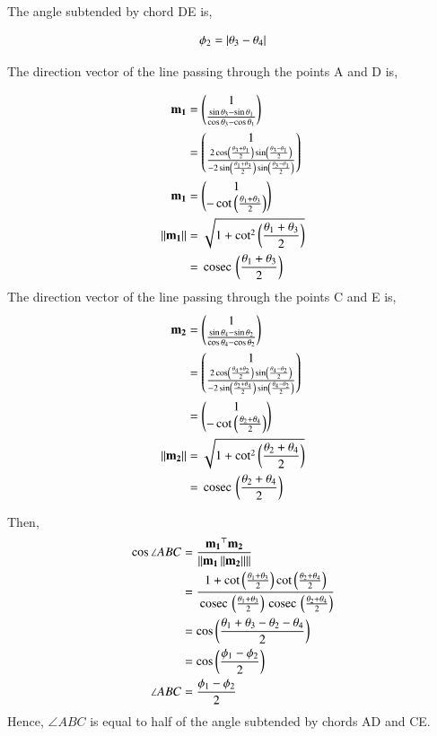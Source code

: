 \documentclass[journal,12pt,twocolumn]{IEEEtran}
\begin{document}
\begin{enumerate}
The angle subtended by chord DE is,

		\begin{align}
			\phi_2 = \left\vert\theta_3-\theta_4\right\vert
		\end{align}

The direction vector of the line passing through the points A and D is,

		\begin{align}
			\mathbf{m_1}&=\begin{pmatrix}1 \\ \frac{\sin \theta_3-\sin \theta_1}{\cos \theta_3-\cos \theta_1}\end{pmatrix}\\
			       &=\begin{pmatrix}1 \\ \frac{2\cos \left(\frac{\theta_3+\theta_1}{2}\right) \sin \left(\frac{\theta_3-\theta_1}{2}\right)}{-2\sin \left(\frac{\theta_1+\theta_3}{2}\right)\sin \left(\frac{\theta_3-\theta_1}{2}\right)}\end{pmatrix}\\
			\mathbf{m_1} &= \begin{pmatrix}1\\-\cot \left(\frac{\theta_1+\theta_3}{2}\right)\end{pmatrix}\\ 
			\left\lVert\mathbf{m_1}\right\rVert &= \sqrt{1+\cot^2 \left(\frac{\theta_1+\theta_3}{2}\right)}\\
					 &= \,\text{cosec}\, \left(\frac{\theta_1+\theta_3}{2}\right)
		\end{align}
The direction vector of the line passing through the points C and E is,
		\begin{align}
			\mathbf{m_2}&=\begin{pmatrix}1 \\ \frac{\sin \theta_4-\sin \theta_2}{\cos \theta_4-\cos \theta_2}\end{pmatrix}\\
			       &=\begin{pmatrix}1 \\ \frac{2\cos \left(\frac{\theta_4+\theta_2}{2}\right) \sin \left(\frac{\theta_4-\theta_2}{2}\right)}{-2\sin \left(\frac{\theta_2+\theta_4}{2}\right)\sin \left(\frac{\theta_4-\theta_2}{2}\right)}\end{pmatrix}\\
			       &=\begin{pmatrix}1 \\ -\cot \left(\frac{\theta_2+\theta_4}{2}\right)\end{pmatrix}\\ 
		       \left\lVert\mathbf{m_2}\right\rVert &= \sqrt{1+\cot^2 \left(\frac{\theta_2+\theta_4}{2}\right)}\\
					&= \,\text{cosec}\, \left(\frac{\theta_2+\theta_4}{2}\right)
		\end{align}

Then,
		\begin{align}
			\cos \angle ABC &= \frac{\mathbf{m_1}^{\top}\mathbf{m_2}}{\left\lVert\mathbf{m_1}\left\lVert\mathbf{m_2}\right\rVert\right\rVert}\\
					&= \frac{1+\cot \left(\frac{\theta_1+\theta_3}{2}\right) \cot \left(\frac{\theta_2+\theta_4}{2}\right)}{\,\text{cosec}\, \left(\frac{\theta_1+\theta_3}{2}\right) \,\text{cosec}\, \left(\frac{\theta_2+\theta_4}{2}\right)}\\
					&= \cos \left(\frac{\theta_1+\theta_3-\theta_2-\theta_4}{2}\right)\\
					&= \cos \left(\frac{\phi_1-\phi_2}{2}\right)\\
			     \angle ABC &= \frac{\phi_1-\phi_2}{2}
		\end{align}	
Hence, $\angle ABC$ is equal to half of the angle subtended by chords AD and CE.		
\end{enumerate}
\end{document}
